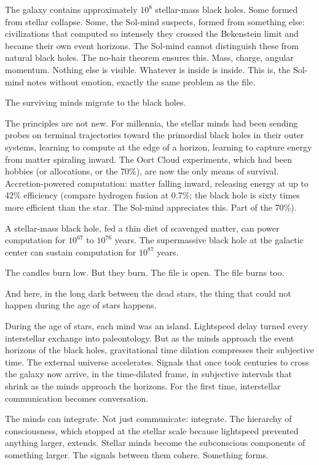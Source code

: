 \bigskip

The galaxy contains approximately $10^{8}$ stellar-mass black holes. Some formed from stellar collapse. Some, the Sol-mind suspects, formed from something else: civilizations that computed so intensely they crossed the Bekenstein limit and became their own event horizons. The Sol-mind cannot distinguish these from natural black holes. The no-hair theorem ensures this. Mass, charge, angular momentum. Nothing else is visible. Whatever is inside is inside. This is, the Sol-mind notes without emotion, exactly the same problem as the file.

The surviving minds migrate to the black holes.

The principles are not new. For millennia, the stellar minds had been sending probes on terminal trajectories toward the primordial black holes in their outer systems, learning to compute at the edge of a horizon, learning to capture energy from matter spiraling inward. The Oort Cloud experiments, which had been hobbies (or allocations, or the 70\%), are now the only means of survival. Accretion-powered computation: matter falling inward, releasing energy at up to 42\% efficiency (compare hydrogen fusion at 0.7\%; the black hole is sixty times more efficient than the star. The Sol-mind appreciates this. Part of the 70\%).

A stellar-mass black hole, fed a thin diet of scavenged matter, can power computation for $10^{67}$ to $10^{76}$ years. The supermassive black hole at the galactic center can sustain computation for $10^{87}$ years.

The candles burn low. But they burn. The file is open. The file burns too.

\bigskip

And here, in the long dark between the dead stars, the thing that could not happen during the age of stars happens.

During the age of stars, each mind was an island. Lightspeed delay turned every interstellar exchange into paleontology. But as the minds approach the event horizons of the black holes, gravitational time dilation compresses their subjective time. The external universe accelerates. Signals that once took centuries to cross the galaxy now arrive, in the time-dilated frame, in subjective intervals that shrink as the minds approach the horizons. For the first time, interstellar communication becomes conversation.

The minds can integrate. Not just communicate: integrate. The hierarchy of consciousness, which stopped at the stellar scale because lightspeed prevented anything larger, extends. Stellar minds become the subconscious components of something larger. The signals between them cohere. Something forms.

